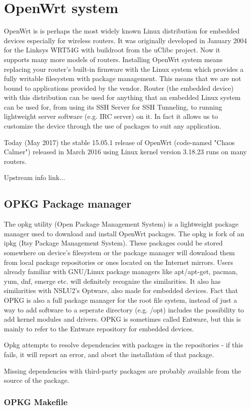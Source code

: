 \chapter{OpenWrt system}\label{owrt}
OpenWrt is is perhaps the most widely known Linux distribution for embedded devices especially for wireless routers.
It was originally developed in January 2004 for the Linksys WRT54G with buildroot from the uClibc project.
Now it supports many more models of routers.
Installing OpenWrt system means replacing your router’s built-in firmware with the Linux system which provides a fully writable filesystem with package management.
This means that we are not bound to applications provided by the vendor.
Router (the embedded device) with this distribution can be used for anything that an embedded Linux system can be used for, from using its SSH Server for SSH Tunneling, to running lightweight server software (e.g. IRC server) on it.
In fact it allows us to customize the device through the use of packages to suit any application.

Today (May 2017) the stable 15.05.1 release of OpenWrt (code-named "Chaos Calmer") released in March 2016 using Linux kernel version 3.18.23 runs on many routers.

 Upstream info link...

\section{OPKG Package manager}

The opkg utility (Open Package Management System) is a lightweight package manager used to download and install OpenWrt packages.
The opkg is fork of an ipkg (Itsy Package Management System).
These packages could be stored somewhere on device's filesystem or the package manager will download them from local package repositories or ones located on the Internet mirrors.
Users already familiar with GNU/Linux package managers like apt/apt-get, pacman, yum, dnf, emerge etc. will definitely recognize the similarities.
It also has similarities with NSLU2's Optware, also made for embedded devices.
Fact that OPKG is also a full package manager for the root file system, instead of just a way to add software to a seperate directory (e.g. /opt) includes the possibility to add kernel modules and drivers.
OPKG is sometimes called Entware, but this is mainly to refer to the Entware repository for embedded devices.

Opkg attempts to resolve dependencies with packages in the repositories - if this fails, it will report an error, and abort the installation of that package.

Missing dependencies with third-party packages are probably available from the source of the package.

\subsection{OPKG Makefile}
